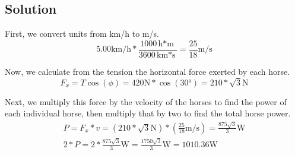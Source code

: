 \documentclass[12pt]{article}
\begin{document}
\subsection*{Solution}
First, we convert units from km/h to m/s. 
\[ 5.00 \unit{\kilo\meter/\hour} * \frac{1000 \unit{\hour*\meter}}{3600 \unit{\kilo\meter*\second}} = \frac{25}{18} \unit{\meter/\second} \]

Now, we calculate from the tension the horizontal force exerted by each horse.
\[ F_x = T\cos(\phi) = 420\unit{\newton} * \cos(30\unit{\degree}) = 210*\sqrt{3}\unit{\newton} \]

Next, we multiply this force by the velocity of the horses to find the power of each individual horse, then multiply that by two to find the total horse power.
\begin{eqnarray*}
    P = F_x*v = (210*\sqrt{3}\unit{\newton}) * (\frac{25}{18} \unit{\meter/\second}) = \frac{875\sqrt{3}}{3} \unit{\watt}\\
    2*P = 2*\frac{875\sqrt{3}}{3} \unit{\watt} = \frac{1750\sqrt{3}}{3} \unit{\watt} = \boxed{1010.36 \unit{\watt}}
\end{eqnarray*}

\pagebreak
\end{document}
